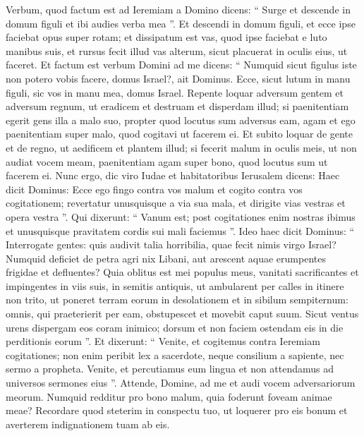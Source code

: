 \begin{biblechapter}
\begin{biblechapter}
\begin{biblechapter}
\begin{biblechapter}
\begin{biblechapter}
\begin{biblechapter}
\begin{biblechapter}
\begin{biblechapter}
\begin{biblechapter}
\begin{biblechapter}
\begin{biblechapter}
\begin{biblechapter}
\begin{biblechapter}
\begin{biblechapter}
\begin{biblechapter}
\begin{biblechapter}
\begin{biblechapter}
\begin{biblechapter}
\verse Verbum, quod factum est ad Ieremiam a Domino dicens: 
\verse “ Surge et descende in domum figuli et ibi audies verba mea ”. 
\verse Et descendi in domum figuli, et ecce ipse faciebat opus super rotam; 
\verse et dissipatum est vas, quod ipse faciebat e luto manibus suis, et rursus fecit illud vas alterum, sicut placuerat in oculis eius, ut faceret. 
\verse Et factum est verbum Domini ad me dicens: 
\verse “ Numquid sicut figulus iste non potero vobis facere, domus Israel?, ait Dominus. Ecce, sicut lutum in manu figuli, sic vos in manu mea, domus Israel. 
\verse Repente loquar adversum gentem et adversum regnum, ut eradicem et destruam et disperdam illud; 
\verse si paenitentiam egerit gens illa a malo suo, propter quod locutus sum adversus eam, agam et ego paenitentiam super malo, quod cogitavi ut facerem ei. 
\verse Et subito loquar de gente et de regno, ut aedificem et plantem illud; 
\verse si fecerit malum in oculis meis, ut non audiat vocem meam, paenitentiam agam super bono, quod locutus sum ut facerem ei. 
\verse Nunc ergo, dic viro Iudae et habitatoribus Ierusalem dicens: Haec dicit Dominus: Ecce ego fingo contra vos malum et cogito contra vos cogitationem; revertatur unusquisque a via sua mala, et dirigite vias vestras et opera vestra ”. 
\verse Qui dixerunt: “ Vanum est; post cogitationes enim nostras ibimus et unusquisque pravitatem cordis sui mali faciemus ”.
 \verse Ideo haec dicit Dominus:
 “ Interrogate gentes:
 quis audivit talia horribilia,
 quae fecit nimis virgo Israel?
 \verse Numquid deficiet de petra agri
 nix Libani,
 aut arescent aquae erumpentes
 frigidae et defluentes?
 \verse Quia oblitus est mei populus meus,
 vanitati sacrificantes
 et impingentes in viis suis,
 in semitis antiquis,
 ut ambularent per calles
 in itinere non trito,
 \verse ut poneret terram eorum in desolationem
 et in sibilum sempiternum:
 omnis, qui praeterierit per eam, obstupescet
 et movebit caput suum.
 \verse Sicut ventus urens dispergam eos
 coram inimico;
 dorsum et non faciem ostendam eis in die perditionis eorum ”.
 \verse Et dixerunt: “ Venite, et cogitemus contra Ieremiam cogitationes; non enim peribit lex a sacerdote, neque consilium a sapiente, nec sermo a propheta. Venite, et percutiamus eum lingua et non attendamus ad universos sermones eius ”.
 \verse Attende, Domine, ad me
 et audi vocem adversariorum meorum.
 \verse Numquid redditur pro bono malum,
 quia foderunt foveam animae meae?
 Recordare quod steterim in conspectu tuo,
 ut loquerer pro eis bonum
 et averterem indignationem tuam ab eis.

\end{biblechapter}
\end{biblechapter}
\end{biblechapter}
\end{biblechapter}
\end{biblechapter}
\end{biblechapter}
\end{biblechapter}
\end{biblechapter}
\end{biblechapter}
\end{biblechapter}
\end{biblechapter}
\end{biblechapter}
\end{biblechapter}
\end{biblechapter}
\end{biblechapter}
\end{biblechapter}
\end{biblechapter}
\end{biblechapter}

